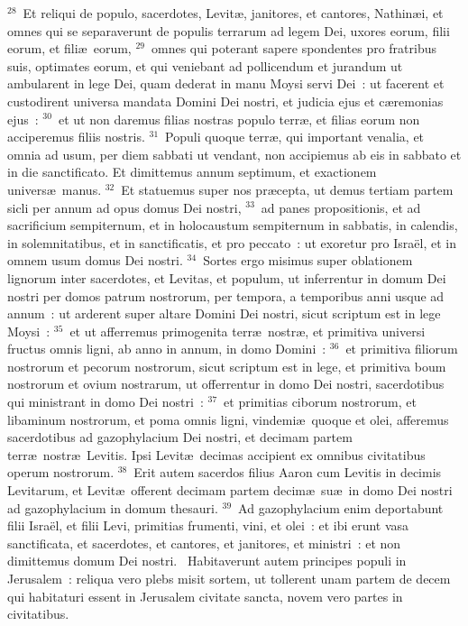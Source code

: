 ${}^{28}$~Et reliqui de populo, sacerdotes, Levit\ae , janitores, et cantores, Nathin\ae i, et omnes qui se separaverunt de populis terrarum ad legem Dei, uxores eorum, filii eorum, et fili\ae\ eorum,
${}^{29}$~omnes qui poterant sapere spondentes pro fratribus suis, optimates eorum, et qui veniebant ad pollicendum et jurandum ut ambularent in lege Dei, quam dederat in manu Moysi servi Dei~: ut facerent et custodirent universa mandata Domini Dei nostri, et judicia ejus et c\ae remonias ejus~:
${}^{30}$~et ut non daremus filias nostras populo terr\ae , et filias eorum non acciperemus filiis nostris.
${}^{31}$~Populi quoque terr\ae , qui important venalia, et omnia ad usum, per diem sabbati ut vendant, non accipiemus ab eis in sabbato et in die sanctificato. Et dimittemus annum septimum, et exactionem univers\ae\ manus.
${}^{32}$~Et statuemus super nos pr\ae cepta, ut demus tertiam partem sicli per annum ad opus domus Dei nostri,
${}^{33}$~ad panes propositionis, et ad sacrificium sempiternum, et in holocaustum sempiternum in sabbatis, in calendis, in solemnitatibus, et in sanctificatis, et pro peccato~: ut exoretur pro Isra\"el, et in omnem usum domus Dei nostri.
${}^{34}$~Sortes ergo misimus super oblationem lignorum inter sacerdotes, et Levitas, et populum, ut inferrentur in domum Dei nostri per domos patrum nostrorum, per tempora, a temporibus anni usque ad annum~: ut arderent super altare Domini Dei nostri, sicut scriptum est in lege Moysi~:
${}^{35}$~et ut afferremus primogenita terr\ae\ nostr\ae , et primitiva universi fructus omnis ligni, ab anno in annum, in domo Domini~:
${}^{36}$~et primitiva filiorum nostrorum et pecorum nostrorum, sicut scriptum est in lege, et primitiva boum nostrorum et ovium nostrarum, ut offerrentur in domo Dei nostri, sacerdotibus qui ministrant in domo Dei nostri~:
${}^{37}$~et primitias ciborum nostrorum, et libaminum nostrorum, et poma omnis ligni, vindemi\ae\ quoque et olei, afferemus sacerdotibus ad gazophylacium Dei nostri, et decimam partem terr\ae\ nostr\ae\ Levitis. Ipsi Levit\ae\ decimas accipient ex omnibus civitatibus operum nostrorum.
${}^{38}$~Erit autem sacerdos filius Aaron cum Levitis in decimis Levitarum, et Levit\ae\ offerent decimam partem decim\ae\ su\ae\ in domo Dei nostri ad gazophylacium in domum thesauri.
${}^{39}$~Ad gazophylacium enim deportabunt filii Isra\"el, et filii Levi, primitias frumenti, vini, et olei~: et ibi erunt vasa sanctificata, et sacerdotes, et cantores, et janitores, et ministri~: et non dimittemus domum Dei nostri.
~Habitaverunt autem principes populi in Jerusalem~: reliqua vero plebs misit sortem, ut tollerent unam partem de decem qui habitaturi essent in Jerusalem civitate sancta, novem vero partes in civitatibus.
